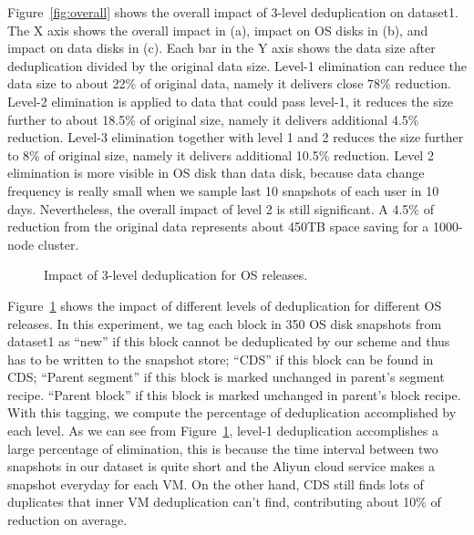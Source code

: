 Figure~\ref{fig:overall} shows the overall impact of 3-level deduplication on dataset1.
The X axis shows the overall impact in (a),  impact on OS disks in (b), and impact on data disks in (c).
Each bar in the Y axis shows the data size after deduplication divided by the original data size.
Level-1 elimination can reduce the data size to about 22\% of original data, namely it delivers close 78\% reduction.
Level-2 elimination is applied to data that could pass level-1, it
reduces the size further to about 18.5\% of original size, namely it delivers additional 4.5\% reduction.
Level-3 elimination together with level 1 and 2
reduces the size further to 8\% of original size, namely it delivers additional 10.5\% reduction.
Level 2 elimination is more visible in OS disk than data disk, because data change frequency is really small
when we sample last 10 snapshots of each user in 10 days. Nevertheless, the overall impact of level 2 is still significant.
A 4.5\% of reduction from the original data represents about 450TB space saving for a 1000-node cluster.


\begin{figure}
  \centering
  \caption{Impact of 3-level deduplication for OS releases.}
  \label{fig:oscds}
\end{figure}

Figure~\ref{fig:oscds} shows the impact of different levels of deduplication for different OS releases.
In this experiment, we tag each block in 350 OS disk snapshots from dataset1 as  ``new''
if this block cannot be deduplicated by our scheme and thus has to be written to the snapshot store;
``CDS''  if this block can be found  in CDS;
``Parent segment'' if  this block is marked unchanged in parent's segment recipe.
``Parent block'' if  this block is marked unchanged in parent's block recipe.
With this tagging, we compute the percentage of deduplication accomplished by each level.
As we can see from Figure~\ref{fig:oscds}, level-1 deduplication accomplishes a large percentage of elimination,
this is because the time interval between two snapshots in our dataset
is quite short and the Aliyun cloud service makes a snapshot  everyday  for each VM.
On the other hand,  CDS still finds lots of duplicates that inner VM deduplication can't find,
contributing about 10\% of reduction on average.

